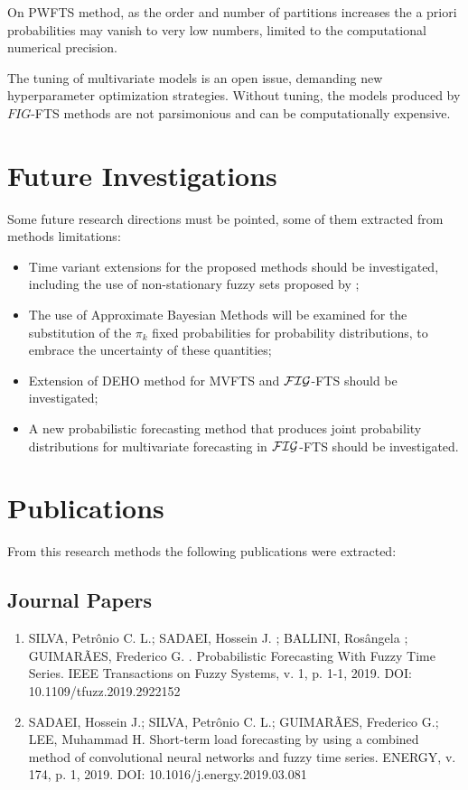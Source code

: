 On PWFTS method, as the order and number of partitions increases the a priori probabilities may vanish to very low numbers, limited to the computational numerical precision.

The tuning of multivariate models is an open issue, demanding new hyperparameter optimization strategies. Without tuning, the models produced by $FIG$-FTS methods are not parsimonious and can be computationally expensive.


\section{Future Investigations}

Some future research directions must be pointed, some of them extracted from methods limitations:

\begin{itemize}
    \item Time variant extensions for the proposed methods should be investigated, including the use of non-stationary fuzzy sets proposed by \cite{Garibaldi2008};
    \item The use of Approximate Bayesian Methods will be examined for the substitution of the $\pi_k$ fixed probabilities for probability distributions, to embrace the uncertainty of these quantities;
    \item Extension of DEHO method for MVFTS and $\mathcal{FIG}$-FTS should be investigated;
    \item A new probabilistic forecasting method that produces joint probability distributions for multivariate forecasting in $\mathcal{FIG}$-FTS should be investigated.
\end{itemize}


\section{Publications}

From this research methods the following publications were extracted:

\subsection{Journal Papers}
\begin{enumerate}
    \item SILVA, Petrônio C. L.; SADAEI, Hossein J. ; BALLINI, Rosângela ; GUIMARÃES, Frederico G. . Probabilistic Forecasting With Fuzzy Time Series. IEEE Transactions on Fuzzy Systems, v. 1, p. 1-1, 2019. DOI: 10.1109/tfuzz.2019.2922152
    \item SADAEI, Hossein J.; SILVA, Petrônio C. L.; GUIMARÃES, Frederico G.; LEE, Muhammad H. Short-term load forecasting by using a combined method of convolutional neural networks and fuzzy time series. ENERGY, v. 174, p. 1, 2019. DOI: 10.1016/j.energy.2019.03.081
\end{enumerate}

